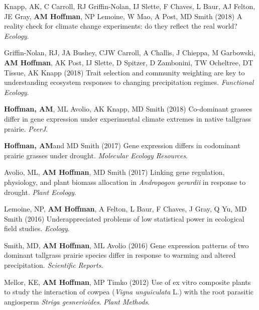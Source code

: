 \documentclass{cv}
\begin{document}
\begin{pubenum}
\item Knapp, AK, C Carroll, RJ Griffin-Nolan, IJ Slette, F Chaves, L Baur, AJ Felton, JE Gray, \textbf{AM Hoffman}, NP Lemoine, W Mao, A Post, MD Smith (2018) A reality check for climate change experiments: do they reflect the real world? \textit{Ecology}. 

\item Griffin-Nolan, RJ, JA Bushey, CJW Carroll, A Challis, J Chieppa, M Garbowski, \textbf{AM Hoffman}, AK Post, IJ Slette, D Spitzer, D Zambonini, TW Ocheltree, DT Tissue, AK Knapp  (2018) Trait selection and community weighting are key to understanding ecosystem responses to changing precipitation regimes. \textit{Functional Ecology}. 

\item\textbf{Hoffman, AM}, ML Avolio, AK Knapp, MD Smith (2018) Co-dominant grasses differ in gene expression under experimental climate extremes in native tallgrass prairie. \textit{PeerJ}. 

\item\textbf{Hoffman, AM}\footnotemark[1] and MD Smith (2017) Gene expression differs in codominant prairie grasses under drought. \textit{Molecular Ecology Resources}. 

\item Avolio, ML, \textbf{AM Hoffman}, MD Smith (2017) Linking gene regulation, physiology, and plant biomass allocation in \textit{Andropogon gerardii} in response to drought. \textit{Plant Ecology}. 

\item Lemoine, NP, \textbf{AM Hoffman}, A Felton, L Baur, F Chaves, J Gray, Q Yu, MD Smith (2016) Underappreciated problems of low statistical power in ecological field studies. \textit{Ecology}. 

\item Smith, MD, \textbf{AM Hoffman}, ML Avolio (2016) Gene expression patterns of two dominant tallgrass prairie species differ in response to warming and altered precipitation. \textit{Scientific Reports}. 

\item Mellor, KE, \textbf{AM Hoffman}, MP Timko (2012) Use of ex vitro composite plants to study the interaction of cowpea (\textit{Vigna unguiculata} L.) with the root parasitic angiosperm \textit{Striga gesnerioides}. \textit{Plant Methods}. 


\end{pubenum}
\end{document}

